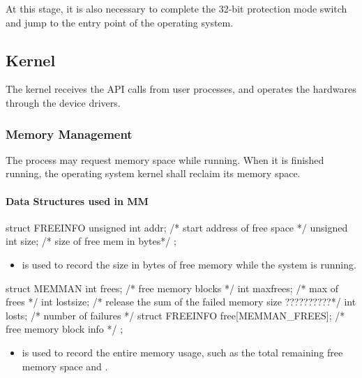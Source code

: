 \documentclass{swfcthesis}
\begin{document}
At this stage, it is also necessary to complete the 32-bit protection mode switch and jump
to the entry point of the operating system.

\subsection{Kernel}
\label{sec:kernel}

The kernel receives the API calls from user processes, and operates the
hardwares through the device drivers.

\subsubsection{Memory Management}
\label{sec:memory-management-1}

The process may request memory space while running. When it is finished running, the
operating system kernel shall reclaim its memory space. %

\paragraph{Data Structures used in MM}

\begin{codeblock}[1]
\begin{ccode}
struct FREEINFO
{ 
  unsigned int addr; /* start address of free space */
  unsigned int size; /* size of free mem in bytes*/
};
\end{ccode}
\end{codeblock}
\begin{itemize}
\item %
  is used to record the size in bytes of free memory while
  the system is running.
\end{itemize}

\begin{codeblock}[1]
\begin{ccode}
struct MEMMAN
{ 
  int frees;    /* free memory blocks */
  int maxfrees; /* max of frees */
  int lostsize; /* release the sum of the failed memory size ??????????*/
  int losts;    /* number of failures */
  struct FREEINFO free[MEMMAN_FREES]; /* free memory block info */
};
\end{ccode}
\end{codeblock}
\begin{itemize}
\item is used to record the entire
memory usage, such as the total remaining free memory space and .
\end{itemize}
\end{document}
